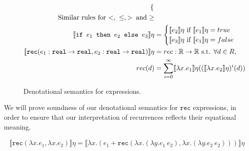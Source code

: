 \begin{figure}
\begin{align*}
\begin{cases}
   \end{cases}
 \\
\text{Similar rules for $<, \ \leq , >$\, and $\geq$} \\
  \llbracket \texttt{if } e_1 \texttt{ then } e_2 \texttt{ else } e_3 \rrbracket \eta &= 
 \begin{cases} 
      \llbracket e_2 \rrbracket\eta \text{ if } \llbracket e_1 \rrbracket\eta = true \\
      \llbracket e_3 \rrbracket\eta \text{ if } \llbracket e_1 \rrbracket\eta = false \\
   \end{cases}
  \\
   \llbracket  \texttt{rec} (e_1 : \texttt{real} \rightarrow \texttt{real}, e_2 : \texttt{real} \rightarrow \texttt{real}) \rrbracket\eta &= rec : \mathbb{R} \rightarrow \mathbb{R} \text{ s.t. } \forall d \in R, \\
   rec(d) &= \sum_{i=0}^{\infty}\llbracket \lambda x.e_1 \rrbracket\eta ((\llbracket \lambda x.e_2 \rrbracket\eta)^i(d))
 \end{align*}
 \caption{Denotational semantics for expressions.}
 \label{fig:densemexps}
 \end{figure}
 
  We will prove soundness of our denotational semantics for $\texttt{rec}$ expressions, in order to ensure that
 our interpretation of recurrences reflects their equational meaning.
 \begin{thm}
 \begin{align*}
 \llbracket \texttt{rec}(\lambda x.e_1, \lambda x.e_2) \rrbracket \eta 
 = \llbracket \lambda x.(e_1 + \texttt{rec}(\lambda x. (\lambda y.e_1  \ e_2), \lambda x. (\lambda y.e_2 \ e_2))) \rrbracket \eta
 \end{align*} 
 \end{thm}
 
